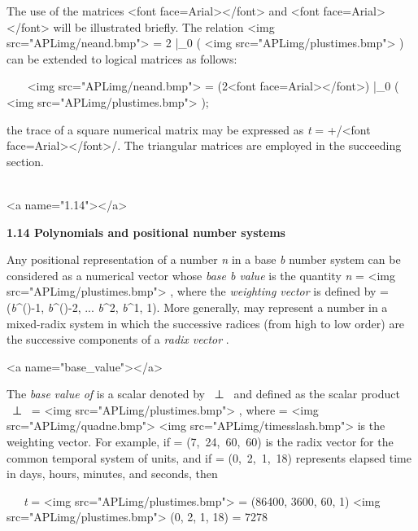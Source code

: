 \par The use of the matrices <font face=Arial></font> and
<font face=Arial></font> will be illustrated briefly. The relation  <img src="APLimg/neand.bmp">  = 
2 |_{0} ( 
<img src="APLimg/plustimes.bmp"> ) can be extended to logical matrices as follows:

\par \ \ \  <img src="APLimg/neand.bmp">  = (2<font face=Arial></font>) |_{0} ( <img src="APLimg/plustimes.bmp"> );

\par the trace of a square numerical matrix  may be expressed as \textit{t} = +/<font face=Arial></font>/. The triangular matrices are employed in the succeeding section.
\\\ 



<a name="1.14"></a>
\par \textbf{1.14 Polynomials and positional number systems}

\par Any positional representation of a number
\textit{n} in a base \textit{b} number system can be considered as a numerical vector  whose \textit{base b value} is the quantity
\textit{n} =  
<img src="APLimg/plustimes.bmp"> , where the \textit{weighting vector}  is defined by  = (\textit{b}^{\textit{\nu}()-1},
\textit{b}^{\textit{\nu}()-2}, ...
\textit{b}^{2}, \textit{b}^{1}, 1). More generally,  may represent a number in a mixed-radix system in which the successive radices (from high to low order) are the successive components of a
\textit{radix vector} .

<a name="base_value"></a>
\par The \textit{base}  \textit{value of}
 is a scalar denoted by 
\ ⊥\  and defined as the scalar product 
\ ⊥\  =  <img src="APLimg/plustimes.bmp"> , where  = <img src="APLimg/quadne.bmp">
<img src="APLimg/timesslash.bmp">  is the weighting vector. For example, if  = (7,\ 24,\ 60,\ 60) is the radix vector for the common temporal system of units, and if  = (0,\ 2,\ 1,\ 18) represents elapsed time in days, hours, minutes, and seconds, then

\par \ \ \ \textit{t} =  
<img src="APLimg/plustimes.bmp">  = (86400, 3600, 60, 1) <img src="APLimg/plustimes.bmp"> (0, 2, 1, 18) = 7278

